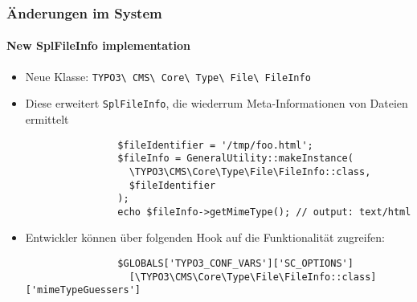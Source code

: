 \begin{frame}[fragile]
	\frametitle{Änderungen im System}
	\framesubtitle{New SplFileInfo implementation}

	\lstset{basicstyle=\smaller\ttfamily}

	\begin{itemize}

		\item Neue Klasse:
			\texttt{TYPO3\textbackslash
				CMS\textbackslash
				Core\textbackslash
				Type\textbackslash
				File\textbackslash
				FileInfo}

		\item Diese erweitert \texttt{SplFileInfo}, die wiederrum Meta-Informationen von Dateien ermittelt

			\begin{lstlisting}
				$fileIdentifier = '/tmp/foo.html';
				$fileInfo = GeneralUtility::makeInstance(
				  \TYPO3\CMS\Core\Type\File\FileInfo::class,
				  $fileIdentifier
				);
				echo $fileInfo->getMimeType(); // output: text/html
			\end{lstlisting}

		\item Entwickler können über folgenden Hook auf die Funktionalität zugreifen:

			\begin{lstlisting}
				$GLOBALS['TYPO3_CONF_VARS']['SC_OPTIONS']
				  [\TYPO3\CMS\Core\Type\File\FileInfo::class]['mimeTypeGuessers']
			\end{lstlisting}

	\end{itemize}

\end{frame}


